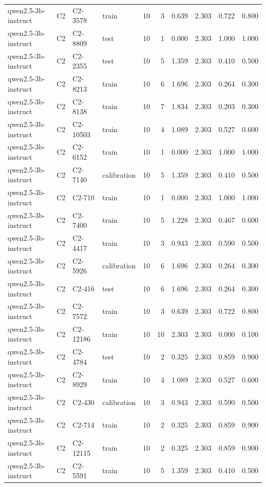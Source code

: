 \begin{table}
\begin{tabular}{llllrrrrrr}
qwen2.5-3b-instruct & C2 & C2-3578 & train & 10 & 3 & 0.639 & 2.303 & 0.722 & 0.800 \\
qwen2.5-3b-instruct & C2 & C2-8809 & test & 10 & 1 & 0.000 & 2.303 & 1.000 & 1.000 \\
qwen2.5-3b-instruct & C2 & C2-2355 & test & 10 & 5 & 1.359 & 2.303 & 0.410 & 0.500 \\
qwen2.5-3b-instruct & C2 & C2-8213 & train & 10 & 6 & 1.696 & 2.303 & 0.264 & 0.300 \\
qwen2.5-3b-instruct & C2 & C2-8138 & train & 10 & 7 & 1.834 & 2.303 & 0.203 & 0.300 \\
qwen2.5-3b-instruct & C2 & C2-10503 & train & 10 & 4 & 1.089 & 2.303 & 0.527 & 0.600 \\
qwen2.5-3b-instruct & C2 & C2-6152 & train & 10 & 1 & 0.000 & 2.303 & 1.000 & 1.000 \\
qwen2.5-3b-instruct & C2 & C2-7140 & calibration & 10 & 5 & 1.359 & 2.303 & 0.410 & 0.500 \\
qwen2.5-3b-instruct & C2 & C2-710 & train & 10 & 1 & 0.000 & 2.303 & 1.000 & 1.000 \\
qwen2.5-3b-instruct & C2 & C2-7400 & train & 10 & 5 & 1.228 & 2.303 & 0.467 & 0.600 \\
qwen2.5-3b-instruct & C2 & C2-4417 & train & 10 & 3 & 0.943 & 2.303 & 0.590 & 0.500 \\
qwen2.5-3b-instruct & C2 & C2-5926 & calibration & 10 & 6 & 1.696 & 2.303 & 0.264 & 0.300 \\
qwen2.5-3b-instruct & C2 & C2-416 & test & 10 & 6 & 1.696 & 2.303 & 0.264 & 0.300 \\
qwen2.5-3b-instruct & C2 & C2-7572 & train & 10 & 3 & 0.639 & 2.303 & 0.722 & 0.800 \\
qwen2.5-3b-instruct & C2 & C2-12186 & train & 10 & 10 & 2.303 & 2.303 & 0.000 & 0.100 \\
qwen2.5-3b-instruct & C2 & C2-4784 & test & 10 & 2 & 0.325 & 2.303 & 0.859 & 0.900 \\
qwen2.5-3b-instruct & C2 & C2-8929 & train & 10 & 4 & 1.089 & 2.303 & 0.527 & 0.600 \\
qwen2.5-3b-instruct & C2 & C2-430 & calibration & 10 & 3 & 0.943 & 2.303 & 0.590 & 0.500 \\
qwen2.5-3b-instruct & C2 & C2-714 & train & 10 & 2 & 0.325 & 2.303 & 0.859 & 0.900 \\
qwen2.5-3b-instruct & C2 & C2-12115 & train & 10 & 2 & 0.325 & 2.303 & 0.859 & 0.900 \\
qwen2.5-3b-instruct & C2 & C2-5591 & train & 10 & 5 & 1.359 & 2.303 & 0.410 & 0.500 \\

\end{tabular}
\end{table}
